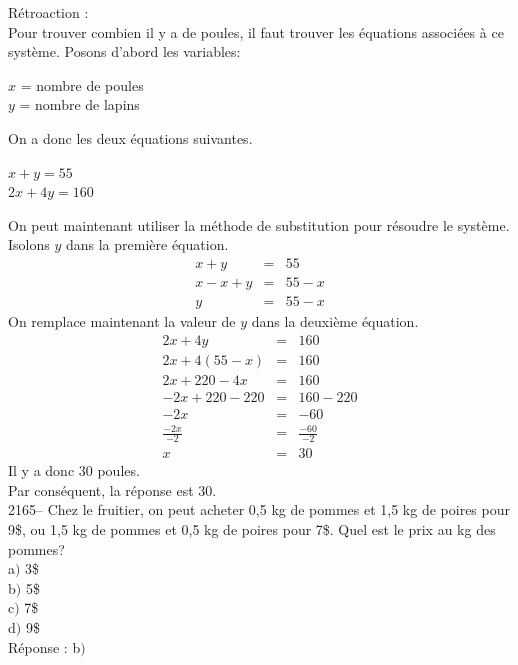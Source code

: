 \documentclass[letterpaper, 12pt]{article}
\begin{document}
R\'etroaction :\\
Pour trouver combien il y a de poules, il faut trouver les \'equations associ\'ees \`a ce syst\`eme. Posons d'abord les variables:
\begin{center}
$x$ = nombre de poules\\
$y$ = nombre de lapins\\
\end{center}
On a donc les deux \'equations suivantes.
\begin{center}
$x+y=55$ \\
$2x+4y=160$\\
\end{center}
On peut maintenant utiliser la m\'ethode de substitution pour r\'esoudre le syst\`eme. Isolons $y$ dans la premi\`ere \'equation.
\begin{eqnarray*}
x+y&=&55 \\
x-x+y&=&55-x \\
y&=&55-x
\end{eqnarray*}
On remplace maintenant la valeur de $y$ dans la deuxi\`eme \'equation.
\begin{eqnarray*}
 2x+4y&=&160\\
 2x+4(55-x)&=&160\\
 2x+220-4x&=&160\\
 -2x+220-220&=&160-220\\
 -2x&=&-60\\[2mm]
\frac{-2x}{-2}&=&\frac{-60}{-2}\\[2mm]
x&=&30
\end{eqnarray*}
Il y a donc 30 poules. \\
Par cons\'equent, la r\'eponse est 30.\\

2165-- Chez le fruitier, on peut acheter 0,5 kg de pommes et 1,5 kg de poires pour 9\$, ou 1,5 kg de pommes et 0,5 kg de poires pour 7\$. Quel est le prix au kg des pommes? \\

a$)$ 3\$ \\
b$)$ 5\$ \\
c$)$ 7\$ \\
d$)$ 9\$ \\

R\'eponse : b$)$\\
\end{document}
